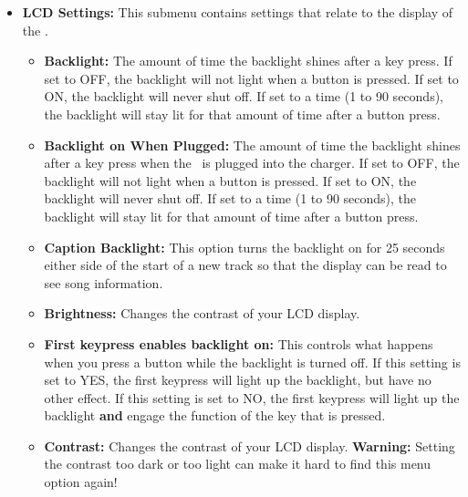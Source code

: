 \begin{itemize}
  \item \textbf{LCD Settings:  }
    This submenu contains settings that relate to the display of the \dap.
    \begin{itemize}
    \item \textbf{Backlight:  }
    The amount of time the backlight shines after a key press. If set to OFF, the backlight will not light when a button is pressed. If set to ON, the backlight will never shut off. If set to a time (1 to 90 seconds), the backlight will stay lit for that amount of time after a button press. 
    \item \textbf{Backlight on When Plugged:  }
    The amount of time the backlight shines after a key press when the \dap\ is plugged into the charger. If set to OFF, the backlight will not light when a button is pressed. If set to ON, the backlight will never shut off. If set to a time (1 to 90 seconds), the backlight will stay lit for that amount of time after a button press. 
    \item \textbf{Caption Backlight:} This option turns the backlight on for 25 seconds either side of the start of a new track so that the display can be read to see song information.
    \item \textbf{Brightness:}
    Changes the contrast of your LCD display.
    \item \textbf{First keypress enables backlight on:}
    This controls what happens when you press a button while the backlight is turned off.  If this setting is set to YES, the first keypress will light up the backlight, but have no other effect.  If this setting is set to NO, the first keypress will light up the backlight \textbf{and} engage the function of the key that is pressed.
    \item \textbf{Contrast:} Changes the contrast of your LCD display. \textbf{Warning:} Setting the contrast too dark or too light can make it hard to find this menu option again!

\end{itemize}
\end{itemize}
